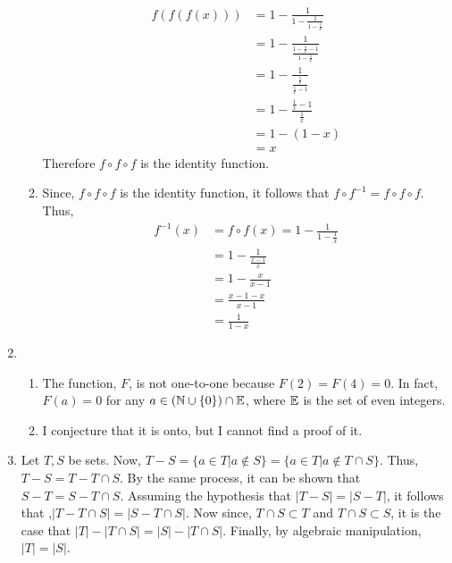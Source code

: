 \documentclass[12pt]{article}
\begin{document}
\begin{enumerate}
\begin{enumerate}
\begin{equation*}
            \begin{split}
                f(f(f(x))) &= 1 - \frac{1}{1 - \frac{1}{1 - \frac{1}{x}}}\\
                &= 1- \frac{1}{\frac{1-\frac{1}{x}-1}{1-\frac{1}{x}}}\\
                &= 1 - \frac{1}{\frac{\frac{1}{x}}{\frac{1}{x}-1}}\\
                &= 1 - \frac{\frac{1}{x}-1}{\frac{1}{x}}\\
                &= 1 - (1-x)\\
                &=x
            \end{split}
        \end{equation*}
        Therefore \(f\circ f\circ f\) is the identity function.
        \item Since, \(f \circ f \circ f\) is the identity function, it follows that \(f\circ f^{-1} = f \circ f \circ f\). Thus, \begin{equation*}
            \begin{split}
                f^{-1}(x) &= f \circ f(x) = 1 - \frac{1}{1-\frac{1}{x}}\\
                &= 1 - \frac{1}{\frac{x-1}{x}}\\
                &= 1 - \frac{x}{x-1}\\
                &= \frac{x-1-x}{x-1}\\
                &= \frac{1}{1-x}
            \end{split}
        \end{equation*}
    \end{enumerate}
    \item \begin{enumerate}
        \item The function, \(F\), is not one-to-one because \(F(2)=F(4)=0\). In fact, \(F(a)=0\) for any \(a\in(\mathbb{N}\cup\{0\})\cap\mathbb{E}\), where \(\mathbb{E}\) is the set of even integers.
        \item I conjecture that it is onto, but I cannot find a proof of it. 
    \end{enumerate}
    \item Let \(T,S\) be sets. Now, \(T-S = \{a\in T| a\not\in S\} = \{a\in T| a\not \in T\cap S\}\). Thus, \(T-S = T - T\cap S\). By the same process, it can be shown that \(S - T = S - T\cap S\). Assuming the hypothesis that \(|T-S| = |S-T|\), it follows that ,\(|T - T\cap S| = |S - T\cap S|\). Now since, \(T\cap S \subset T\) and \(T\cap S\subset S\), it is the case that \(|T|-|T\cap S| = |S| - |T\cap S|\). Finally, by algebraic manipulation, \(|T|=|S|\). 
\end{enumerate}
\end{document}
